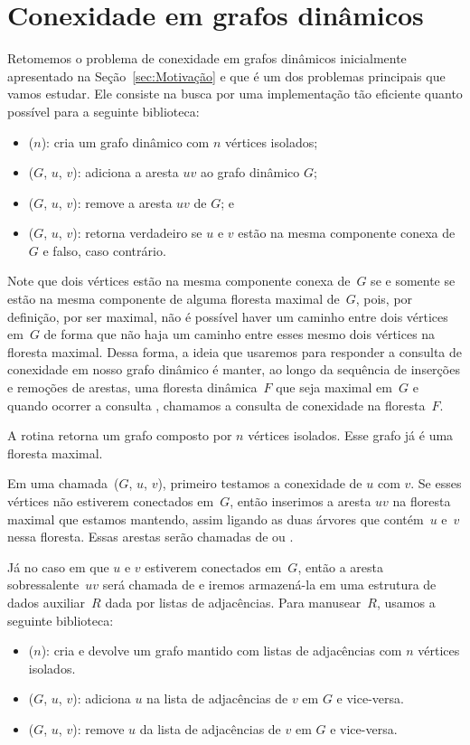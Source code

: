 \chapter{Conexidade em grafos dinâmicos}
\label{sec:connDG}
Retomemos o problema de conexidade em grafos dinâmicos inicialmente apresentado na Seção~\ref{sec:Motivação} e que é um dos problemas principais que vamos estudar. Ele consiste na busca por uma implementação tão eficiente quanto possível para a seguinte biblioteca: 
\begin{itemize}
\item \dymGraphCreate($n$): cria um grafo dinâmico com $n$ vértices isolados;
\item \dymGraphAddEdge($G$, $u$, $v$): adiciona a aresta $uv$ ao grafo dinâmico $G$;
\item \dymGraphDelEdge($G$, $u$, $v$): remove a aresta $uv$ de $G$; e
\item \dymGraphQuery($G$, $u$, $v$): retorna verdadeiro se $u$ e $v$ estão na mesma componente conexa de $G$ e falso, caso contrário.
\end{itemize}

Note que dois vértices estão na mesma componente conexa de~$G$ se e somente se estão na mesma componente de alguma floresta maximal de~$G$, pois, por definição, por ser maximal, não é possível haver um caminho entre dois vértices em~$G$ de forma que não haja um caminho entre esses mesmo dois vértices na floresta maximal. Dessa forma, a ideia que usaremos para responder a consulta de conexidade em nosso grafo dinâmico é manter, ao longo da sequência de inserções e remoções de arestas, uma floresta dinâmica~$F$ que seja maximal em~$G$ e quando ocorrer a consulta \dymGraphQuery{}, chamamos a consulta de conexidade na floresta~$F$.

A rotina \dymGraphCreate{} retorna um grafo composto por $n$ vértices isolados. Esse grafo já é uma floresta maximal.

Em uma chamada~\dymGraphAddEdge($G$, $u$, $v$), primeiro testamos a conexidade de $u$ com $v$. Se esses vértices não estiverem conectados em~$G$, então inserimos a aresta $uv$ na floresta maximal que estamos mantendo, assim ligando as duas árvores que contém~$u$ e~$v$ nessa floresta. Essas arestas serão chamadas de  ou .

Já no caso em que $u$ e $v$ estiverem conectados em~$G$, então a aresta sobressalente~$uv$ será chamada de  e iremos armazená-la em uma estrutura de dados auxiliar~$R$ dada por listas de adjacências. Para manusear~$R$, usamos a seguinte biblioteca:
\begin{itemize}
    \item \graphCreate($n$): cria e devolve um grafo mantido com listas de adjacências com $n$ vértices isolados.
    \item \graphAdd($G$, $u$, $v$): adiciona $u$ na lista de adjacências de $v$ em $G$ e vice-versa.
    \item \graphDel($G$, $u$, $v$): remove $u$ da lista de adjacências de $v$ em $G$ e vice-versa.
\end{itemize}

